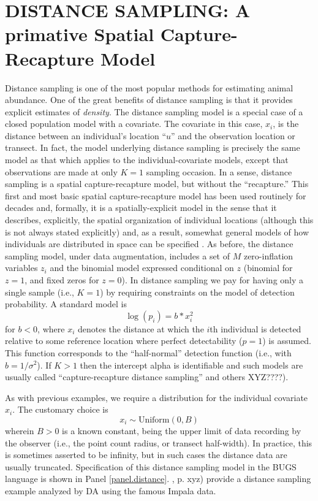 \section{DISTANCE SAMPLING: A primative Spatial Capture-Recapture Model}

Distance sampling is one of the most popular methods for estimating
animal abundance. One of the great benefits of distance sampling is
that it provides explicit estimates of {\it density}. The distance
sampling model is a special case of a closed population model with a
covariate. The covariate in this case, $x_{i}$, is the distance
between an individual's location ``$u$'' and the observation location
or transect. In fact, the model underlying distance sampling is
precisely the same model as that which applies to the
individual-covariate models, except that observations are made at only
$K=1$ sampling occasion. In a sense, distance sampling is a spatial
capture-recapture model, but without the ``recapture.''  This first
and most basic spatial capture-recapture model has been used routinely
for decades and, formally, it is a spatially-explicit model in the
sense that it describes, explicitly, the spatial organization of
individual locations (although this is not always stated explicitly)
and, as a result, somewhat general models of how individuals are
distributed in space can be specified \citep{royle_etal:2004,
  johnson_etal:2010, sillett_etal:2011}.
As before, the distance sampling model, under data augmentation, includes a set of $M$ zero-inflation variables $z_{i}$ and the binomial model expressed conditional on $z$ (binomial for $z=1$, and fixed zeros for $z=0$).  In distance sampling we pay for having only a single sample (i.e., $K=1$) by requiring constraints on the model of detection probability. A standard model is
\[
\log(p_{i}) = b * x_{i}^{2}
\]
for $b < 0$, where $x_i$ denotes the distance at which the $i$th
individual is detected relative to some reference location where
perfect detectability ($p=1$) is assumed. This function corresponds to
the ``half-normal'' detection function (i.e., with $b =
1/\sigma^{2}$).  If $K>1$ then the intercept alpha is identifiable and
such models are usually called ``capture-recapture distance
sampling''\citep{borchers_etal:XXXX} and others XYZ????).

As with previous examples, we require a distribution for the individual covariate $x_{i}$. The customary choice is
\[
x_{i} \sim \mbox{Uniform}(0,B)
\]
wherein $B>0$ is a known constant, being the upper limit of data
recording by the observer (i.e., the point count radius, or transect
half-width). In practice, this is sometimes asserted to be infinity,
but in such cases the distance data are usually truncated.
Specification of this distance sampling model in the BUGS language is
shown in Panel \ref{panel.distance}. \citet{royle_dorazio:2008}, p. xyz) provide a distance sampling example analyzed by DA using the famous Impala data.


